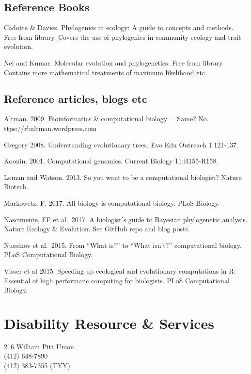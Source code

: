 \documentclass[
]{book}
\begin{document}
\hypertarget{reference-books}{%
\section{Reference Books}\label{reference-books}}

Cadotte \& Davies. Phylogenies in ecology: A guide to concepts and methods.
Free from library. Covers the use of phylogenies in community ecology and trait evolution.

Nei and Kumar. Molecular evolution and phylogenetics.
Free from library. Contains more mathematical treatments of maximum likelihood etc.

\hypertarget{reference-articles-blogs-etc}{%
\section{Reference articles, blogs etc}\label{reference-articles-blogs-etc}}

Altman. 2009. \href{https://rbaltman.wordpress.com/2009/02/18/bioinformatics-computational-biology-same-no/}{Bioinformatics \& computational biology = Same? No.} ttps://rbaltman.wordpress.com

Gregory 2008. Understanding evolutionary trees. Evo Edu Outreach 1:121-137.

Koonin. 2001. Computational genomics. Current Biology 11:R155-R158.

Loman and Watson. 2013. So you want to be a computational biologist? Nature Biotech.

Markowetz, F. 2017. All biology is computational biology. PLoS Biology.

Nascimente, FF et al.~2017. A biologist's guide to Bayesian phylogenetic analysis. Nature Ecology \& Evolution. See GitHub repo and blog posts.

Nussinov et al.~2015. From ``What is?'' to ``What isn't?'' computational biology. PLoS Computational Biology.

Visser et al 2015. Speeding up ecological and evolutionary computations in R: Essential of high performanc computing for biologists. PLoS Computational Biology.

\hypertarget{DRS}{%
\chapter{Disability Resource \& Services}\label{DRS}}

216 William Pitt Union\\
(412) 648-7890\\
(412) 383-7355 (TYY)
\end{document}
